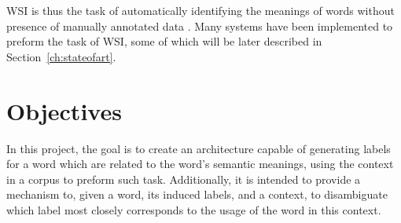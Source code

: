 \ac{WSI} is thus the task of automatically identifying the meanings of words
without presence of manually annotated data \cite{agirre2007semeval}. Many
systems have been implemented to preform the task of \ac{WSI}, some of which
will be later described in Section~\ref{ch:stateofart}.

\section{Objectives}

In this project, the goal is to create an architecture capable of generating
labels for a word which are related to the word's semantic meanings, using the
context in a corpus to preform such task. Additionally, it is intended to
provide a mechanism to, given a word, its induced labels, and a context, to
disambiguate which label most closely corresponds to the usage of the word in
this context.


